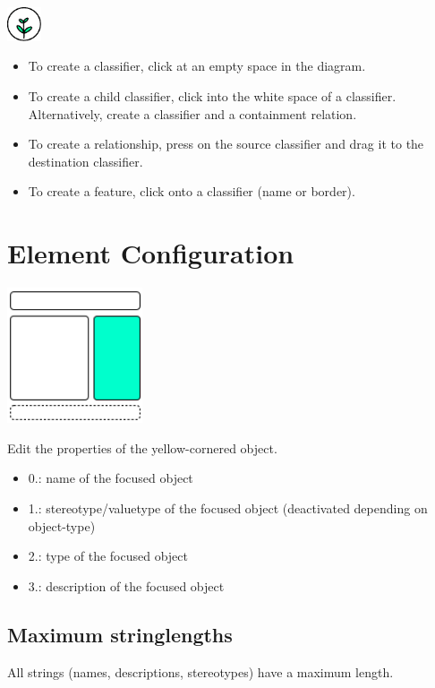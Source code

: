 \includegraphics[width=1cm]{../../gui/source/resources/tool_create.pdf}
\begin{itemize}
\item To create a classifier, click at an empty space in the diagram.
\item To create a child classifier, click into the white space of a classifier.
    Alternatively, create a classifier and a containment relation.
\item To create a relationship, press on the source classifier and drag it to the destination classifier.
\item To create a feature, click onto a classifier (name or border).
\end{itemize}

\section{Element Configuration}

\includegraphics[width=4cm]{main_window_sketch_3.png}

Edit the properties of the yellow-cornered object.

\begin{itemize}
\item 0.: name of the focused object
\item 1.: stereotype/valuetype of the focused object (deactivated depending on object-type)
\item 2.: type of the focused object
\item 3.: description of the focused object
\end{itemize}

\subsection{Maximum stringlengths}

All strings (names, descriptions, stereotypes) have a maximum length.


